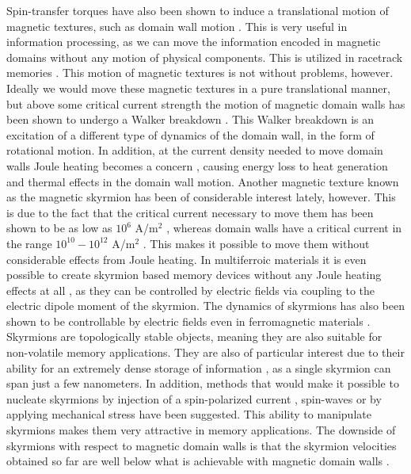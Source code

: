 Spin-transfer torques have also been shown to induce a translational motion of magnetic textures, such as domain wall motion \cite{Gan2000,Vernier2004}. This is very useful in information processing, as we can move the information encoded in magnetic domains without any motion of physical components. This is utilized in racetrack memories \cite{Parkin2008}. This motion of magnetic textures is not without problems, however. Ideally we would move these magnetic textures in a pure translational manner, but above some critical current strength the motion of magnetic domain walls has been shown to undergo a Walker breakdown \cite{SchryerWalker1974}. This Walker breakdown is an excitation of a different type of dynamics of the domain wall, in the form of rotational motion. In addition, at the current density needed to move domain walls Joule heating becomes a concern \cite{Yamaguchi2005}, causing energy loss to heat generation and thermal effects in the domain wall motion. Another magnetic texture known as the magnetic skyrmion has been of considerable interest lately, however. This is due to the fact that the critical current necessary to move them has been shown to be as low as $10^6$ A/m$^2$ \cite{Jonietz2010,Schulz2012,Yu2012}, whereas domain walls have a critical current in the range $10^{10}-10^{12}$ A/m$^2$ \cite{Grollier2003,Parkin2008}. This makes it possible to move them without considerable effects from Joule heating. In multiferroic materials it is even possible to create skyrmion based memory devices without any Joule heating effects at all \cite{Mochizuki2015}, as they can be controlled by electric fields via coupling to the electric dipole moment of the skyrmion. The dynamics of skyrmions has also been shown to be controllable by electric fields even in ferromagnetic materials \cite{Upadhyaya2015}.  Skyrmions are topologically stable objects, meaning  they are also suitable for non-volatile memory applications. They are also of particular interest due to their ability for an extremely dense storage of information \cite{Fert2013}, as a single skyrmion can span just a few nanometers. In addition, methods that would make it possible to nucleate skyrmions by injection of a spin-polarized current \cite{Sampaio2013}, spin-waves \cite{Liu2015} or by applying mechanical stress \cite{Nii2015} have been suggested. This ability to manipulate skyrmions makes them very attractive in memory applications. The downside of skyrmions with respect to magnetic domain walls is that the skyrmion velocities obtained so far are well below what is achievable with magnetic domain walls \cite{Fert2013,Yang2015}. 


